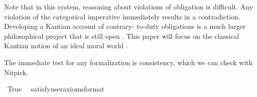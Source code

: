 \begin{isabellebody}
\begin{isamarkuptext}
Note that in this system, reasoning about violations of obligation is difficult. Any violation of the 
categorical imperative immediately results in a contradiction. Developing a Kantian account of contrary-
to-duty obligations is a much larger philosophical project that is still open \cite{KorsgaardRTL}. This paper will focus 
on the classical Kantian notion of an ideal moral world \cite{idealtheory}.

The immediate test for any formalization is consistency, which we can check with Nitpick.%
\end{isamarkuptext}\isamarkuptrue%
\isamarkupfalse%
\ True\ \isamarkupfalse%
\ {\isacharbrackleft}satisfy{\isacharcomma}user{\isacharunderscore}axioms{\isacharcomma}format{\isacharequal}{}{\isacharbrackright}%
\isadelimproof
\ %
\endisadelimproof
%
\isatagproof
{}\isamarkupfalse%
\isanewline
%
\end{isabellebody}
